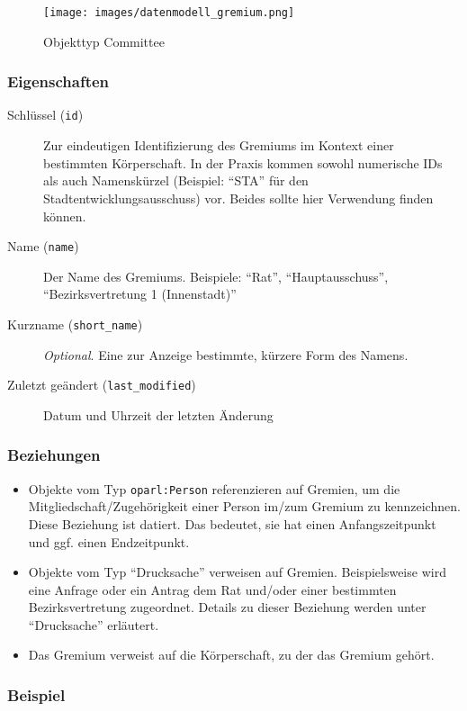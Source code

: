 \documentclass[,a4paper]{article}
\makeatletter
\def\maxwidth{\ifdim\Gin@nat@width>\linewidth\linewidth
\else\Gin@nat@width\fi}
\let\Oldincludegraphics\includegraphics
\renewcommand{\includegraphics}[1]{\Oldincludegraphics[width=\maxwidth]{#1}}
\makeatother
\begin{document}
\begin{figure}[htbp]
\centering
\texttt{[image: images/datenmodell\_gremium.png]}
\caption{Objekttyp Committee}
\end{figure}

\subsubsection{Eigenschaften}

\begin{description}
\item[Schlüssel (\texttt{id})]
Zur eindeutigen Identifizierung des Gremiums im Kontext einer bestimmten
Körperschaft. In der Praxis kommen sowohl numerische IDs als auch
Namenskürzel (Beispiel: ``STA'' für den Stadtentwicklungsausschuss) vor.
Beides sollte hier Verwendung finden können.
\item[Name (\texttt{name})]
Der Name des Gremiums. Beispiele: ``Rat'', ``Hauptausschuss'',
``Bezirksvertretung 1 (Innenstadt)''
\item[Kurzname (\texttt{short\_name})]
\emph{Optional}. Eine zur Anzeige bestimmte, kürzere Form des Namens.
\item[Zuletzt geändert (\texttt{last\_modified})]
Datum und Uhrzeit der letzten Änderung
\end{description}

\subsubsection{Beziehungen}

\begin{itemize}
\item
  Objekte vom Typ \texttt{oparl:Person} referenzieren auf Gremien, um
  die Mitgliedschaft/Zugehörigkeit einer Person im/zum Gremium zu
  kennzeichnen. Diese Beziehung ist datiert. Das bedeutet, sie hat einen
  Anfangszeitpunkt und ggf. einen Endzeitpunkt.
\item
  Objekte vom Typ ``Drucksache'' verweisen auf Gremien. Beispielsweise
  wird eine Anfrage oder ein Antrag dem Rat und/oder einer bestimmten
  Bezirksvertretung zugeordnet. Details zu dieser Beziehung werden unter
  ``Drucksache'' erläutert.
\item
  Das Gremium verweist auf die Körperschaft, zu der das Gremium gehört.
\end{itemize}

\subsubsection{Beispiel}
\end{document}
